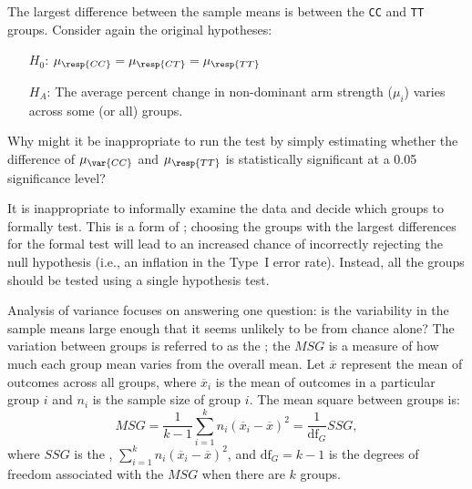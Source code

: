 \begin{examplewrap}
\begin{nexample}{The largest difference between the sample means is between the \texttt{CC} and \texttt{TT} groups. Consider again the original hypotheses:
		\begin{itemize}
			\setlength{\itemsep}{0mm}
			\item[$H_0$:] $\mu_{\resp{CC}} = \mu_{\resp{CT}} = \mu_{\resp{TT}}$
			\item[$H_A$:] The average percent change in non-dominant arm strength ($\mu_i$) varies across some (or all) groups.
		\end{itemize}
		Why might it be inappropriate to run the test by simply estimating whether the difference of $\mu_{\var{CC}}$ and $\mu_{\resp{TT}}$ is statistically significant at a 0.05 significance level?}\label{multipleComparisonExample}%
It is inappropriate to informally examine the data and decide which groups to formally test. This is a form of ; choosing the groups with the largest differences for the formal test will lead to an increased chance of incorrectly rejecting the null hypothesis (i.e., an inflation in the Type~I error rate). Instead, all the groups should be tested using a single hypothesis test.
\end{nexample}
\end{examplewrap}

Analysis of variance focuses on answering one question: is the variability in the sample means large enough that it seems unlikely to be from chance alone? The variation between groups is referred to as the ; the $MSG$ is a measure of how much each group mean varies from the overall mean. Let $\overline{x}$ represent the mean of outcomes across all groups, where $\overline{x}_i$ is the mean of outcomes in a particular group $i$ and $n_i$ is the sample size of group $i$. The mean square between groups is:
\[MSG = \frac{1}{k-1}\sum_{i=1}^{k} n_{i}\left(\overline{x}_{i} - \overline{x}\right)^{2} = \frac{1}{\textrm{df}_{G}}SSG,\] 
where $SSG$ is the , $\sum_{i=1}^{k} n_{i}\left(\overline{x}_{i} - \overline{x}\right)^{2}$, and $\textrm{df}_{G}=k-1$ is the degrees of freedom associated with the $MSG$ when there are $k$ groups.

\textD{\newpage}

